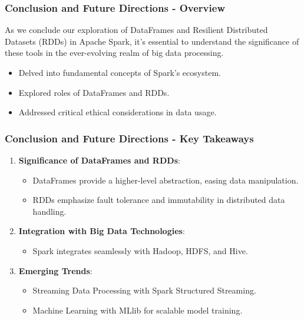 \documentclass[aspectratio=169]{beamer}
\begin{document}
\begin{frame}[fragile]
    \frametitle{Conclusion and Future Directions - Overview}
    As we conclude our exploration of DataFrames and Resilient Distributed Datasets (RDDs) in Apache Spark, it's essential to understand the significance of these tools in the ever-evolving realm of big data processing.
    
    \begin{itemize}
        \item Delved into fundamental concepts of Spark's ecosystem.
        \item Explored roles of DataFrames and RDDs.
        \item Addressed critical ethical considerations in data usage.
    \end{itemize}
\end{frame}

\begin{frame}[fragile]
    \frametitle{Conclusion and Future Directions - Key Takeaways}
    \begin{enumerate}
        \item \textbf{Significance of DataFrames and RDDs}:
            \begin{itemize}
                \item DataFrames provide a higher-level abstraction, easing data manipulation.
                \item RDDs emphasize fault tolerance and immutability in distributed data handling.
            \end{itemize}
        \item \textbf{Integration with Big Data Technologies}:
            \begin{itemize}
                \item Spark integrates seamlessly with Hadoop, HDFS, and Hive.
            \end{itemize}
        \item \textbf{Emerging Trends}:
            \begin{itemize}
                \item Streaming Data Processing with Spark Structured Streaming.
                \item Machine Learning with MLlib for scalable model training.
            \end{itemize}
    \end{enumerate}
\end{frame}
\end{document}
